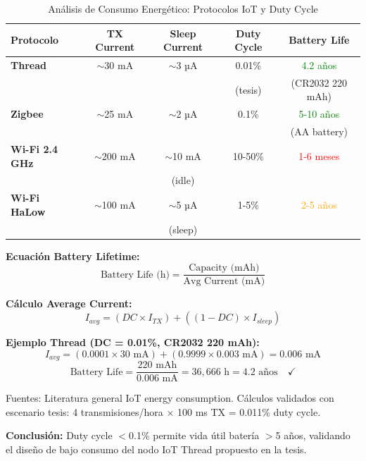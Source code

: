 
\begin{table}[htbp]
\centering
\caption{Análisis de Consumo Energético: Protocolos IoT y Duty Cycle}
\label{tab:iot_energy_consumption_duty_cycle}
\begin{tabular}{|l|c|c|c|c|}
\hline
\textbf{Protocolo} & \textbf{TX Current} & \textbf{Sleep Current} & \textbf{Duty Cycle} & \textbf{Battery Life} \\
\hline
\hline
\textbf{Thread} & $\sim$30 mA & $\sim$3 µA & 0.01\% & \textcolor{green}{4.2 años} \\
& & & (tesis) & (CR2032 220 mAh) \\
\hline
\textbf{Zigbee} & $\sim$25 mA & $\sim$2 µA & 0.1\% & \textcolor{green}{5-10 años} \\
& & & & (AA battery) \\
\hline
\textbf{Wi-Fi 2.4 GHz} & $\sim$200 mA & $\sim$10 mA & 10-50\% & \textcolor{red}{1-6 meses} \\
& & (idle) & & \\
\hline
\textbf{Wi-Fi HaLow} & $\sim$100 mA & $\sim$5 µA & 1-5\% & \textcolor{orange}{2-5 años} \\
& & (sleep) & & \\
\hline
\end{tabular}
\medskip

\small
\textbf{Ecuación Battery Lifetime:}
\begin{equation}
\text{Battery Life (h)} = \frac{\text{Capacity (mAh)}}{\text{Avg Current (mA)}}
\end{equation}

\textbf{Cálculo Average Current:}
\begin{equation}
I_{avg} = (DC \times I_{TX}) + ((1 - DC) \times I_{sleep})
\end{equation}

\textbf{Ejemplo Thread (DC = 0.01\%, CR2032 220 mAh):}
$$
I_{avg} = (0.0001 \times 30\text{ mA}) + (0.9999 \times 0.003\text{ mA}) = 0.006\text{ mA}
$$
$$
\text{Battery Life} = \frac{220\text{ mAh}}{0.006\text{ mA}} = 36,666\text{ h} = 4.2\text{ años} \quad \checkmark
$$

\medskip
Fuentes: Literatura general IoT energy consumption. Cálculos validados con 
escenario tesis: 4 transmisiones/hora $\times$ 100 ms TX = 0.011\% duty cycle.

\medskip
\textbf{Conclusión:} Duty cycle $<$0.1\% permite vida útil batería $>$5 años, 
validando el diseño de bajo consumo del nodo IoT Thread propuesto en la tesis.
\end{table}

